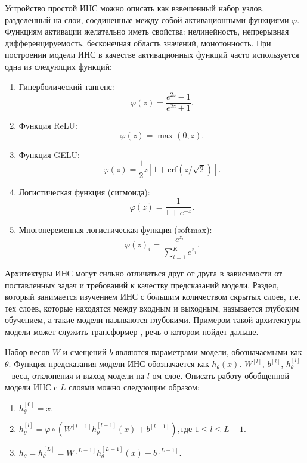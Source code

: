 Устройство простой ИНС можно описать как взвешенный набор узлов, разделенный на слои, соединенные между собой активационными функциями $\varphi$. Функциям активации желательно иметь свойства: нелинейность, непрерывная дифференцируемость, бесконечная область значений, монотонность. При построении модели ИНС в качестве активационных функций часто используется одна из следующих функций:
\begin{enumerate}
    \item Гиперболический тангенс:
          \begin{equation}
              \varphi(z) = \frac{e^{2z}-1}{e^{2z}+1}.
          \end{equation}
    \item Функция ReLU:
          \begin{equation}
              \varphi(z) = \max(0, z).
              \label{relu}
          \end{equation}
    \item Функция GELU:
          \begin{equation}
              \varphi(z) = \frac{1}{2}z\left[1+\text{erf}\left({z}/\sqrt{2}\right)\right].
              \label{gelu}
          \end{equation}
    \item Логистическая функция (сигмоида):
          \begin{equation}
              \varphi(z) = \frac{1}{1+e^{-z}}.
          \end{equation}
    \item Многопеременная логистическая функция (softmax):
          \begin{equation}
              \varphi(z)_i = \frac{e^{z_i}}{\sum_{i=1}^{K}e^{z_j}}.
          \end{equation}
\end{enumerate}

Архитектуры ИНС могут сильно отличаться друг от друга в зависимости от поставленных задач и требований к качеству предсказаний модели. Раздел, который занимается изучением ИНС с большим количеством скрытых слоев, т.е. тех слоев, которые находятся между входным и выходным, называется глубоким обучением, а такие модели называются глубокими. Примером такой архитектуры модели может служить  трансформер \cite{transformer-paper}, речь о котором пойдет дальше.

Набор весов $W$ и смещений $b$ являются параметрами модели, обозначаемыми как $\theta$. Функция предсказания модели ИНС обозначается как $h_\theta(x)$. $W^{[l]}$, $b^{[l]}$, $h_{\theta}^{[l]}$ -- веса, отклонения и выход модели на $l$-ом слое. Описать работу обобщенной модели ИНС c $L$ слоями можно следующим образом:
\begin{enumerate}
    \item $h_{\theta}^{[0]} = x$.
    \item $h_{\theta}^{[l]} = \varphi \circ \left(W^{[l-1]}h_{\theta}^{[l-1]}(x) + b^{[l-1]}\right), \text{где } 1 \le l \le L-1$.
    \item $h_{\theta} = h_{\theta}^{[L]} = W^{[L-1]}h_{\theta}^{[L-1]}(x) + b^{[L-1]}$.
\end{enumerate}

